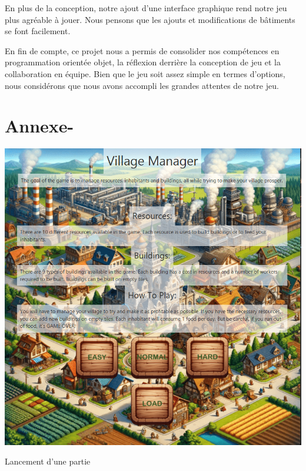 \documentclass[a4paper,11pt]{article}
\begin{document}
En plus de la conception, notre ajout d'une interface graphique rend notre jeu plus agréable à jouer. Nous pensons que les ajouts et modifications de bâtiments se font facilement.

En fin de compte, ce projet nous a permis de consolider nos compétences en programmation orientée objet, la réflexion derrière la conception de jeu et la collaboration en équipe. Bien que le jeu soit assez simple en termes d'options, nous considérons que nous avons accompli les grandes attentes de notre jeu.

\section{Annexe-}
\begin{table}[ht]
	\centering
	\begin{subtable}{.3\linewidth}
		\centering
		\includegraphics[width=1\linewidth]{startPage.png}
		\caption{Lancement d'une partie}
		\label{subfig:image1}
	\end{subtable}%
	\hfill
	\begin{subtable}{.3\linewidth}
		\centering

\end{subtable}
\end{table}
\end{document}
